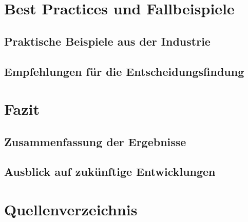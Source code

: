 \documentclass[12pt,bibtotoc]{article}
\newcounter{romanBeginningEnd} %
\begin{document}
	\section{Best Practices und Fallbeispiele}
		\subsection{Praktische Beispiele aus der Industrie}
		\subsection{Empfehlungen für die Entscheidungsfindung}

	\section{Fazit}
		\subsection{Zusammenfassung der Ergebnisse}
		\subsection{Ausblick auf zukünftige Entwicklungen}




	
	
	\newpage
	\setcounter{page}{\theromanBeginningEnd} %
	\setcounter{secnumdepth}{0} %
	\section{Quellenverzeichnis}
	\setcounter{secnumdepth}{3} %
	\printbibliography[heading=none]
	\newpage
	\appendix
	\clearpage
	
\end{document}
